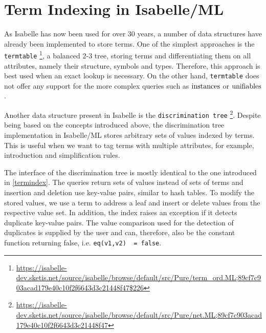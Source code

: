 
\section{Term Indexing in Isabelle/ML}
As Isabelle has now been used for over 30 years, a number of data structures have already been implemented to store terms. One of the simplest approaches is the \lstinline{termtable} \footnote{\url{https://isabelle-dev.sketis.net/source/isabelle/browse/default/src/Pure/term_ord.ML;89cf7c903acad179e40c10f2f6643d3c21448f47$226}}, %
a balanced 2-3 tree, storing terms and differentiating them on all attributes, namely their structure, symbols and types. Therefore, this approach is best used when an exact lookup is necessary. On the other hand, \lstinline{termtable} does not offer any support for the more complex queries such as $\mathrm{instances}$ or $\mathrm{unifiables}$.

Another data structure present in Isabelle is the \lstinline{discrimination tree} \footnote{\url{https://isabelle-dev.sketis.net/source/isabelle/browse/default/src/Pure/net.ML;89cf7c903acad179e40c10f2f6643d3c21448f47}}. Despite being based on the concepts introduced above, the discrimination tree implementation in Isabelle/ML stores arbitrary sets of values indexed by terms. This is useful when we want to tag terms with multiple attributes, for example, introduction and simplification rules.

The interface of the discrimination tree is mostly identical to the one introduced in \cref{termindex}. The queries return sets of values instead of sets of terms and insertion and deletion use key-value pairs, similar to hash tables. To modify the stored values, we use a term to address a leaf and insert or delete values from the respective value set. In addition, the index raises an exception if it detects duplicate key-value pairs. The value comparison used for the detection of duplicates is supplied by the user and can, therefore, also be the constant function returning false, i.e. \lstinline{eq(v1,v2)  = false}.


